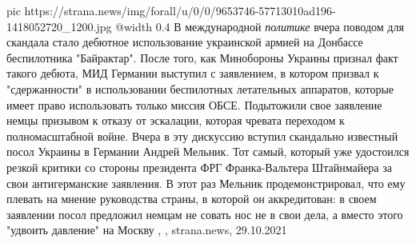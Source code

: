 \ifcmt
  pic https://strana.news/img/forall/u/0/0/9653746-57713010ad196-1418052720_1200.jpg
  @width 0.4
\fi
В международной \emph{политике} вчера поводом для скандала стало дебютное
использование украинской армией на Донбассе беспилотника "Байрактар". После
того, как Минобороны Украины признал факт такого дебюта, МИД Германии выступил
с заявлением, в котором призвал к "сдержанности" в использовании беспилотных
летательных аппаратов, которые имеет право использовать только миссия ОБСЕ.
Подытожили свое заявление немцы призывом к отказу от эскалации, которая чревата
переходом к полномасштабной войне.  Вчера в эту дискуссию вступил скандально
известный посол Украины в Германии Андрей Мельник. Тот самый, который уже
удостоился резкой критики со стороны президента ФРГ Франка-Вальтера Штайнмайера
за свои антигерманские заявления. В этот раз Мельник продемонстрировал, что ему
плевать на мнение руководства страны, в которой он аккредитован: в своем
заявлении посол предложил немцам не совать нос не в свои дела, а вместо этого
"удвоить давление" на Москву
, 
, strana.news, 29.10.2021
